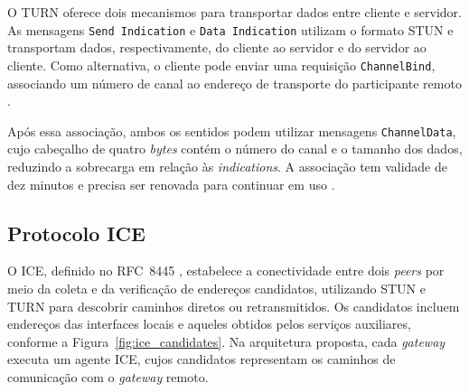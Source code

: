O TURN oferece dois mecanismos para transportar dados entre cliente e servidor. As mensagens \texttt{Send Indication} e \texttt{Data Indication} utilizam o formato STUN e transportam dados, respectivamente, do cliente ao servidor e do servidor ao cliente. Como alternativa, o cliente pode enviar uma requisição \texttt{ChannelBind}, associando um número de canal ao endereço de transporte do participante remoto \citep{rfc8656}.

Após essa associação, ambos os sentidos podem utilizar mensagens \texttt{ChannelData}, cujo cabeçalho de quatro \textit{bytes} contém o número do canal e o tamanho dos dados, reduzindo a sobrecarga em relação às \textit{indications}. A associação tem validade de dez minutos e precisa ser renovada para continuar em uso \citep{rfc8656}.

\subsection{Protocolo ICE}

O ICE, definido no RFC~8445 \citep{rfc8445}, estabelece a conectividade entre dois \textit{peers} por meio da coleta e da verificação de endereços candidatos, utilizando STUN e TURN para descobrir caminhos diretos ou retransmitidos. Os candidatos incluem endereços das interfaces locais e aqueles obtidos pelos serviços auxiliares, conforme a Figura~\ref{fig:ice_candidates}. Na arquitetura proposta, cada \textit{gateway} executa um agente ICE, cujos candidatos representam os caminhos de comunicação com o \textit{gateway} remoto.

